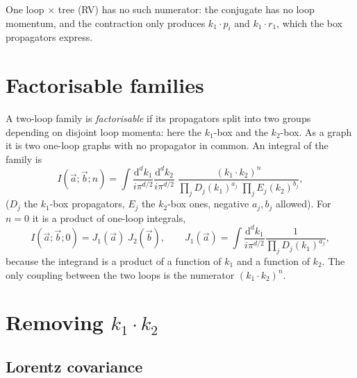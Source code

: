 \documentclass[11pt,a4paper]{article}
\newcommand{\dd}{\mathrm{d}}
\newcommand{\note}[1]{\par\smallskip\noindent\colorbox{gray!12}{\parbox{\dimexpr\linewidth-2\fboxsep}{\small #1}}\par\smallskip}
\begin{document}
\note{One loop $\times$ tree (RV) has no such numerator: the conjugate has no loop momentum, and the contraction only
produces $k_1\cdot p_i$ and $k_1\cdot r_1$, which the box propagators express.}

\section{Factorisable families}\label{sec:fact}

A two-loop family is \emph{factorisable} if its propagators split into two groups depending on disjoint loop
momenta: here the $k_1$-box and the $k_2$-box. As a graph it is two one-loop graphs with no propagator in common.
An integral of the family is
\begin{equation}
I(\vec a;\vec b;n)=\int\!\frac{\dd^dk_1}{i\pi^{d/2}}\frac{\dd^dk_2}{i\pi^{d/2}}\;
\frac{(k_1\cdot k_2)^n}{\prod_{j}D_j(k_1)^{a_j}\;\prod_{j}E_j(k_2)^{b_j}},
\end{equation}
($D_j$ the $k_1$-box propagators, $E_j$ the $k_2$-box ones, negative $a_j,b_j$ allowed). For $n=0$ it is a product
of one-loop integrals,
\begin{equation}
I(\vec a;\vec b;0)=J_1(\vec a)\;J_2(\vec b),\qquad
J_1(\vec a)=\int\!\frac{\dd^dk_1}{i\pi^{d/2}}\frac{1}{\prod_jD_j(k_1)^{a_j}},
\end{equation}
because the integrand is a product of a function of $k_1$ and a function of $k_2$. The only coupling between the two
loops is the numerator $(k_1\cdot k_2)^n$.

\section{Removing $k_1\cdot k_2$}\label{sec:k1k2}

\subsection{Lorentz covariance}
\end{document}
